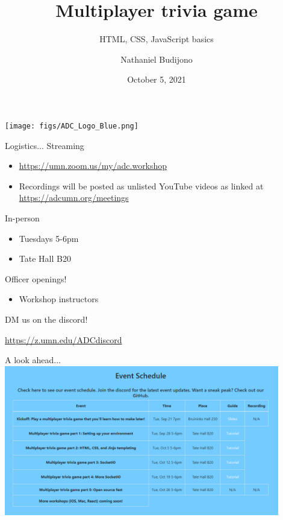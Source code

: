 \documentclass{beamer}
\title{Multiplayer trivia game}
\subtitle{HTML, CSS, JavaScript basics}
\author{Nathaniel Budijono}
\date{October 5, 2021}
\institute{UMN ADC}
\begin{document}
\begin{frame}
    \titlepage
    \texttt{[image: figs/ADC\_Logo\_Blue.png]}
\end{frame}

\begin{frame}{Logistics...}
	Streaming
	\begin{itemize}
		\item \href{https://umn.zoom.us/my/adc.workshop}{https://umn.zoom.us/my/adc.workshop}
		\item Recordings will be posted as unlisted YouTube videos as linked at \href{https://adcumn.org/meetings}{https://adcumn.org/meetings}
	\end{itemize}

	\bigskip\pause

	In-person
	\begin{itemize}
		\item Tuesdays 5-6pm
		\item Tate Hall B20
	\end{itemize}
\end{frame}

\begin{frame}{Officer openings!}
	\begin{itemize}
		\item Workshop instructors
	\end{itemize}

	\bigskip

	DM us on the discord!

	\bigskip

	\href{https://z.umn.edu/ADCdiscord}{https://z.umn.edu/ADCdiscord}
\end{frame}

\begin{frame}{A look ahead...}
	\centering
	\includegraphics[width=0.9\textwidth]{figs/schedule.png}
\end{frame}
\end{document}
